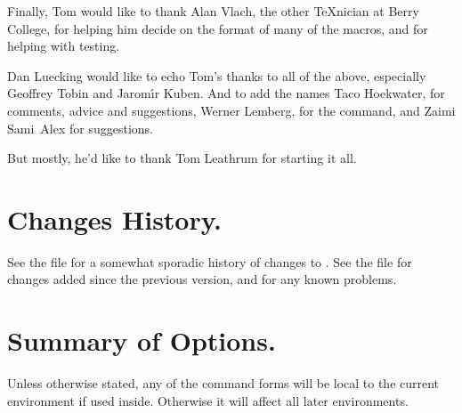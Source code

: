\documentclass[letterpaper]{article}
\begin{document}
Finally, Tom would like to thank
Alan Vlach,
the other \TeX{}nician at Berry College, for helping him decide on the
format of many of the macros, and for helping with testing.

\medskip
Dan Luecking would like to echo Tom's thanks to all of the above,
especially Geoffrey Tobin and Jarom\'\i r Kuben. And to add the names
Taco Hoekwater, for comments, advice and suggestions, Werner Lemberg,
for the  command, and Zaimi Sami~Alex for suggestions.

But mostly, he'd like to thank Tom Leathrum for starting it all.


\section{Changes History.}\label{changes}

See the file  for a somewhat sporadic history of
changes to \mfp{}. See the file  for changes added since
the previous version, and for any known problems.


\section{Summary of Options.}\label{summary}

Unless otherwise stated, any of the command forms will be local to the
current  environment if used inside. Otherwise it will affect
all later environments.

\medskip
\def\stack#1{{\tabular[t]{@{}l@{}}#1\endtabular}}
\end{document}
